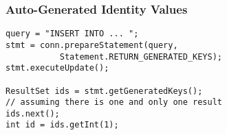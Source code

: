 \documentclass[dvipsnames]{beamer}
\theoremstyle{plain}
\begin{document}
\begin{frame}[fragile]
  \frametitle{Auto-Generated Identity Values}

  \begin{lstlisting}
query = "INSERT INTO ... ";
stmt = conn.prepareStatement(query,
           Statement.RETURN_GENERATED_KEYS);
stmt.executeUpdate();

ResultSet ids = stmt.getGeneratedKeys();
// assuming there is one and only one result
ids.next();
int id = ids.getInt(1);
  \end{lstlisting}
\end{frame}
%
%
%
%
%
%
%
%
%
%
%
\end{document}
